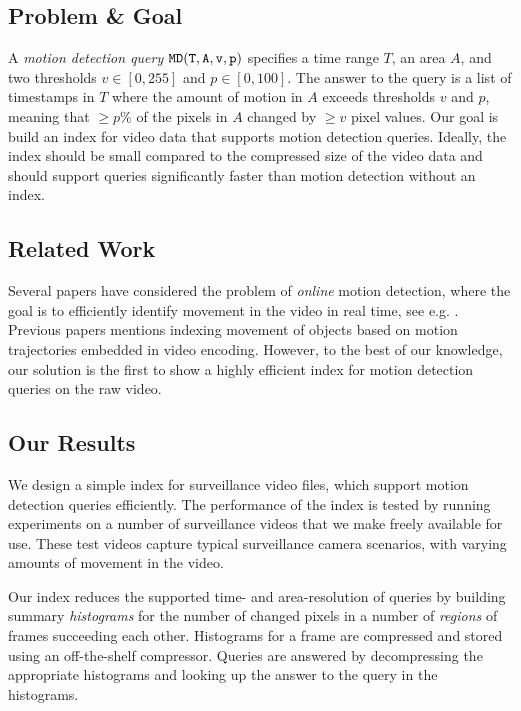 


\subsection{Problem \& Goal}
A \emph{motion detection query} $\mathtt{MD(T, A, v, p)}$ specifies a time range $T$, an area $A$, and two thresholds $v \in [0, 255]$ and $p \in [0, 100]$. The answer to the query is a list of timestamps in $T$ where the amount of motion in $A$ exceeds thresholds $v$ and $p$, meaning that $\geq p\%$ of the pixels in $A$ changed by $\geq v$ pixel values. Our goal is build an index for video data that supports motion detection queries. Ideally, the index should be small compared to the compressed size of the video data and should support queries significantly faster than motion detection without an index. 

\subsection{Related Work}
Several papers have considered the problem of \emph{online} motion detection, where the goal is to efficiently identify movement in the video in real time, see e.g. \cite{sachs1994real, tian2005robust, hu2004survey, cutler2000robust, huang2011advanced}. Previous papers \cite{du2014event, kao2008a} mentions indexing movement of objects based on motion trajectories embedded in video encoding. However, to the best of our knowledge, our solution is the first to show a highly efficient index for motion detection queries on the raw video. 

\subsection{Our Results}
We design a simple index for surveillance video files, which support motion detection queries efficiently. The performance of the index is tested by running experiments on a number of surveillance videos that we make freely available for use. These test videos capture typical surveillance camera scenarios, with varying amounts of movement in the video.

Our index reduces the supported time- and area-resolution of queries by building summary \emph{histograms} for the number of changed pixels in a number of \emph{regions} of frames succeeding each other. Histograms for a frame are compressed and stored using an off-the-shelf compressor. Queries are answered by decompressing the appropriate histograms and looking up the answer to the query in the histograms.

